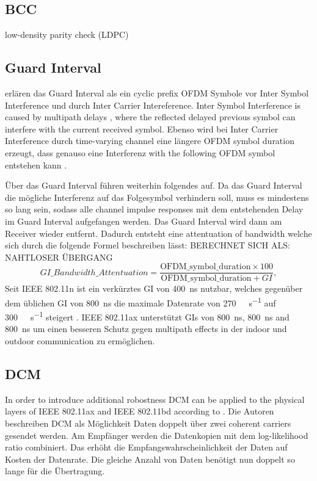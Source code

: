 \documentclass[]{nsm-thesis}
\begin{document}
\subsection{BCC}
low-density parity check (LDPC)
\subsection{Guard Interval}
\textcite{pulimamidi_development_2007} erlären das Guard Interval als ein cyclic prefix OFDM Symbole vor Inter Symbol Interference und durch Inter Carrier Intereference. Inter Symbol Interference is caused by multipath delays , where the reflected delayed previous symbol can interfere with the current received symbol\cite{ravindranath_performance_2016}. Ebenso wird bei Inter Carrier Interference durch time-varying channel eine längere OFDM symbol duration erzeugt, dass genauso eine Interferenz with the following OFDM symbol entstehen kann \cite{van_duc_nguyen_intercarrier_2002}.

Über das Guard Interval führen \textcite{pulimamidi_development_2007} weiterhin folgendes auf. 
Da das Guard Interval die mögliche Interferenz auf das Folgesymbol verhindern soll, muss es mindestens so lang sein, sodass alle channel impulse responses mit dem entstehenden Delay im Guard Interval aufgefangen werden. 
Das Guard Interval wird dann am Receiver wieder entfernt. Dadurch entsteht eine attentuation of bandwidth welche sich durch die folgende Formel beschreiben lässt: BERECHNET SICH ALS: NAHTLOSER ÜBERGANG 
\begin{equation}\label{eq:GI}
	GI\_Bandwidth\_Attentuation =
	\frac{
		\text{OFDM\_symbol\_duration} \times 100
	}{
		\text{OFDM\_symbol\_duration} + GI
	}
	,
\end{equation}
Seit IEEE 802.11n ist ein verkürztes \ac{GI} von  \SI{400}{\nano\second} nutzbar, welches gegenüber dem üblichen \ac{GI} von  \SI{800}{\nano\second} die  maximale Datenrate von \SI{270}{\mega\bit\per\second} auf \SI{300}{\mega\bit\per\second} steigert \cite{sauter_wireless_2022}. IEEE 802.11ax unterstützt \ac{GI}s von \SI{800}{\nano\second}, \SI{800}{\nano\second} and \SI{800}{\nano\second} um einen besseren Schutz gegen  multipath effects in der indoor und outdoor communication zu ermöglichen. 
\subsection{\ac{DCM}}
In order to introduce additional robostness \ac{DCM} can be applied to the physical layers of IEEE 802.11ax and IEEE 802.11bd according to \textcite{jacobs}. Die Autoren beschreiben \ac{DCM} als Möglichkeit Daten doppelt über zwei coherent carriers gesendet werden. Am Empfänger werden die Datenkopien mit dem log-likelihood ratio combiniert. Das erhöht die Empfangswahrscheinlichkeit der Daten auf Kosten der Datenrate. Die gleiche Anzahl von Daten benötigt nun doppelt so lange für die Übertragung. 
\end{document}
